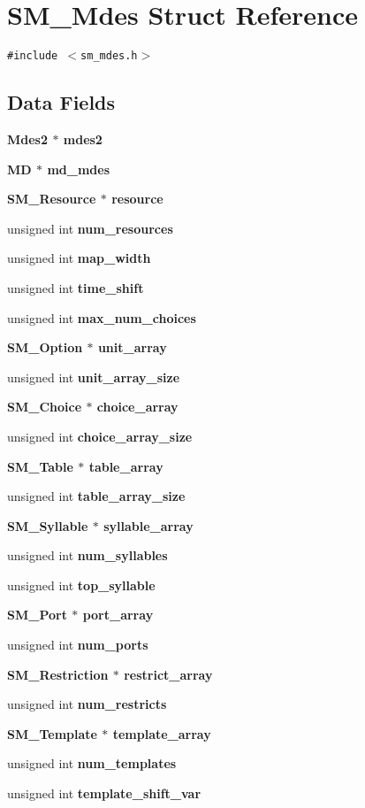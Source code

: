 \section{SM\_\-Mdes Struct Reference}
\label{structSM__Mdes}
{\tt \#include $<$sm\_\-mdes.h$>$}

\subsection*{Data Fields}
\begin{CompactItemize}
\item 
\bf{Mdes2} $\ast$ \bf{mdes2}
\item 
\bf{MD} $\ast$ \bf{md\_\-mdes}
\item 
\bf{SM\_\-Resource} $\ast$ \bf{resource}
\item 
unsigned int \bf{num\_\-resources}
\item 
unsigned int \bf{map\_\-width}
\item 
unsigned int \bf{time\_\-shift}
\item 
unsigned int \bf{max\_\-num\_\-choices}
\item 
\bf{SM\_\-Option} $\ast$ \bf{unit\_\-array}
\item 
unsigned int \bf{unit\_\-array\_\-size}
\item 
\bf{SM\_\-Choice} $\ast$ \bf{choice\_\-array}
\item 
unsigned int \bf{choice\_\-array\_\-size}
\item 
\bf{SM\_\-Table} $\ast$ \bf{table\_\-array}
\item 
unsigned int \bf{table\_\-array\_\-size}
\item 
\bf{SM\_\-Syllable} $\ast$ \bf{syllable\_\-array}
\item 
unsigned int \bf{num\_\-syllables}
\item 
unsigned int \bf{top\_\-syllable}
\item 
\bf{SM\_\-Port} $\ast$ \bf{port\_\-array}
\item 
unsigned int \bf{num\_\-ports}
\item 
\bf{SM\_\-Restriction} $\ast$ \bf{restrict\_\-array}
\item 
unsigned int \bf{num\_\-restricts}
\item 
\bf{SM\_\-Template} $\ast$ \bf{template\_\-array}
\item 
unsigned int \bf{num\_\-templates}
\item 
unsigned int \bf{template\_\-shift\_\-var}
\item 

\end{CompactItemize}

